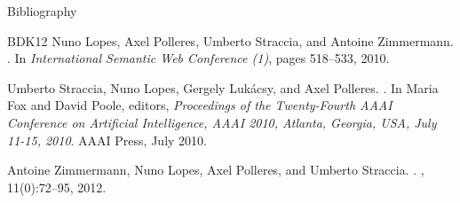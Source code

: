 \documentclass[table,svgnames]{beamer}
\begin{document}
{\begin{frame}[allowframebreaks]{Bibliography}
\begin{thebibliography}{BDK{\etalchar{+}}12}
Nuno Lopes, Axel Polleres, Umberto Straccia, and Antoine Zimmermann.
.
\newblock In {\em {International Semantic Web Conference (1)}}, pages 518--533,
  2010.

Umberto Straccia, Nuno Lopes, Gergely Luk{\'a}csy, and Axel Polleres.
.
\newblock In Maria Fox and David Poole, editors, {\em {Proceedings of the
  Twenty-Fourth AAAI Conference on Artificial Intelligence, AAAI 2010, Atlanta,
  Georgia, USA, July 11-15, 2010}}. AAAI Press, July 2010.

Antoine Zimmermann, Nuno Lopes, Axel Polleres, and Umberto Straccia.
.
, 11(0):72--95, 2012.

\end{thebibliography}

  \end{frame}
}


\setcounter{framenumber}{\value{finalframe}}
\end{document}
